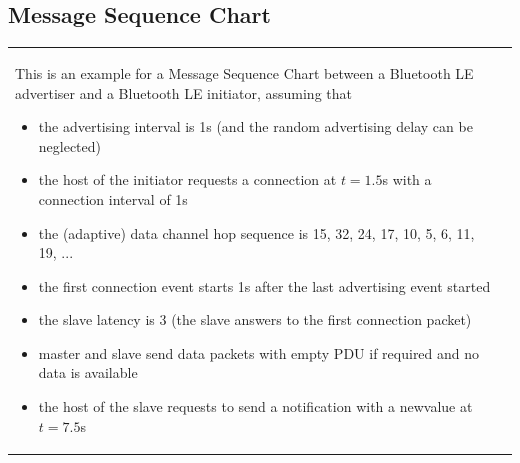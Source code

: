 	\subsection{Message Sequence Chart}
		\begin{tabular}{ll}
			\parbox{11cm}{
				This is an example for a Message Sequence Chart between a Bluetooth LE advertiser and a Bluetooth LE initiator, assuming that 
				\begin{itemize}
					\item the advertising interval is 1s (and the random advertising delay can be neglected)  
					\item the host of the initiator requests a connection at $t = 1.5$s with a connection interval of 1s  
					\item the (adaptive) data channel hop sequence is 15, 32, 24, 17, 10, 5, 6, 11, 19, ...  
					\item the first connection event starts 1s after the last advertising event started  
					\item the slave latency is 3 (the slave answers to the first connection packet)  
					\item master and slave send data packets with empty PDU if required and no data is available   
					\item the host of the slave requests to send a notification with a newvalue at $t = 7.5$s 
				\end{itemize}
			}
			& \parbox{7cm}{
			}	
		\end{tabular}
			

